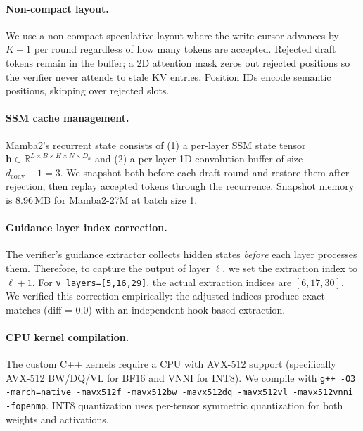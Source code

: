 \paragraph{Non-compact layout.}
We use a non-compact speculative layout where the write cursor advances by $K+1$ per round regardless of how many tokens are accepted.
Rejected draft tokens remain in the buffer; a 2D attention mask zeros out rejected positions so the verifier never attends to stale KV entries.
Position IDs encode semantic positions, skipping over rejected slots.

\paragraph{SSM cache management.}
Mamba2's recurrent state consists of (1) a per-layer SSM state tensor $\mathbf{h} \in \mathbb{R}^{L \times B \times H \times N \times D_h}$ and (2) a per-layer 1D convolution buffer of size $d_{\mathrm{conv}} - 1 = 3$.
We snapshot both before each draft round and restore them after rejection, then replay accepted tokens through the recurrence.
Snapshot memory is 8.96\,MB for Mamba2-27M at batch size 1.

\paragraph{Guidance layer index correction.}
The verifier's guidance extractor collects hidden states \emph{before} each layer processes them.
Therefore, to capture the output of layer $\ell$, we set the extraction index to $\ell + 1$.
For \texttt{v\_layers=[5,16,29]}, the actual extraction indices are $[6, 17, 30]$.
We verified this correction empirically: the adjusted indices produce exact matches (diff = 0.0) with an independent hook-based extraction.

\paragraph{CPU kernel compilation.}
The custom C++ kernels require a CPU with AVX-512 support (specifically AVX-512 BW/DQ/VL for BF16 and VNNI for INT8).
We compile with \texttt{g++ -O3 -march=native -mavx512f -mavx512bw -mavx512dq -mavx512vl -mavx512vnni -fopenmp}.
INT8 quantization uses per-tensor symmetric quantization for both weights and activations.
